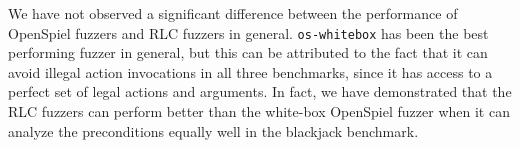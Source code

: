 We have not observed a significant difference between the performance of OpenSpiel fuzzers and RLC fuzzers in general.
\texttt{os-whitebox} has been the best performing fuzzer in general, but this can be attributed to the fact that it can avoid illegal action invocations in all three benchmarks, since it has access to a perfect set of legal actions and arguments.
In fact, we have demonstrated that the RLC fuzzers can perform better than the white-box OpenSpiel fuzzer when it can analyze the preconditions equally well in the blackjack benchmark.
